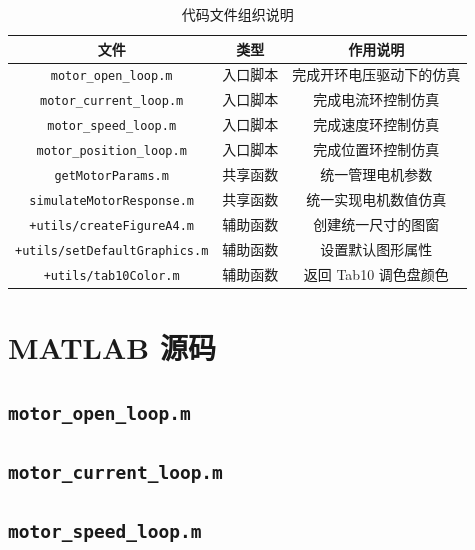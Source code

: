 \documentclass[a4paper, 12pt]{ctexart}
\begin{document}
\begin{table}[H]
  \centering
  \caption{代码文件组织说明}
  \begin{tabular}{ccc}
    \toprule
    文件                                      & 类型   & 作用说明           \\
    \midrule
    \nolinkurl{motor_open_loop.m}           & 入口脚本 & 完成开环电压驱动下的仿真   \\
    \nolinkurl{motor_current_loop.m}        & 入口脚本 & 完成电流环控制仿真      \\
    \nolinkurl{motor_speed_loop.m}          & 入口脚本 & 完成速度环控制仿真      \\
    \nolinkurl{motor_position_loop.m}       & 入口脚本 & 完成位置环控制仿真      \\
    \nolinkurl{getMotorParams.m}            & 共享函数 & 统一管理电机参数       \\
    \nolinkurl{simulateMotorResponse.m}     & 共享函数 & 统一实现电机数值仿真     \\
    \nolinkurl{+utils/createFigureA4.m}     & 辅助函数 & 创建统一尺寸的图窗      \\
    \nolinkurl{+utils/setDefaultGraphics.m} & 辅助函数 & 设置默认图形属性       \\
    \nolinkurl{+utils/tab10Color.m}         & 辅助函数 & 返回 Tab10 调色盘颜色 \\
    \bottomrule
  \end{tabular}
\end{table}

\section{MATLAB 源码}

\subsection*{\texttt{motor\_open\_loop.m}}

\subsection*{\texttt{motor\_current\_loop.m}}

\subsection*{\texttt{motor\_speed\_loop.m}}
\end{document}
